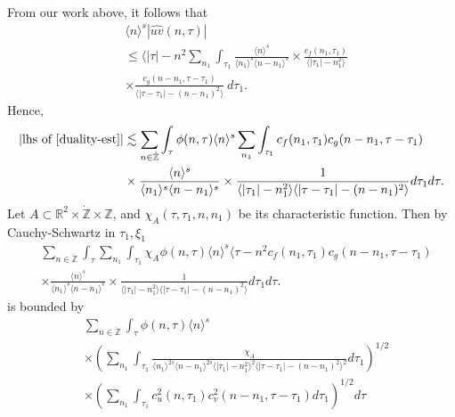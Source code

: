 \documentclass[12pt,reqno]{amsart}
\numberwithin{equation}{section}  %
\renewcommand{\cref}{\Cref}
\newcommand{\rr}{\mathbb{R}}
\newcommand{\zz}{\mathbb{Z}}
\newcommand{\zzdot}{\dot{\zz}}
\newcommand{\wh}{\widehat}
\begin{document}
%
%
From our work above, it follows that 
%
%
\begin{equation}
	\label{convo-est-starting-pnt}
	\begin{split}
		 & \langle n \rangle^s  | \wh{uv}\left( 
		n, \tau \right) |
		\\
		& \le \langle |\tau| - n^{2} 
		\sum_{n_{1}} \int_{\tau_{1}} \frac{\langle n \rangle^{s}}{\langle n_1 \rangle^s
    \langle n - n_1 \rangle^s} 
		\times \frac{c_f(n_1, \tau_1)}{\langle |\tau_1| - n_1^{2} \rangle}
		\\
		& \times
		\frac{c_g(n - n_1, \tau - \tau_1 )}{\langle |\tau - \tau_1| - (n - n_1)^{2}
    \rangle}\ d \tau_1.
	\end{split}
\end{equation}
%
%
Hence, 
%
%
\begin{equation}
  \label{pre-fubini-int-form}
	\begin{split}
    |\text{lhs of} \ \cref{duality-est}|
	& \lesssim \sum_{n \in \zzdot} \int_{\tau} \phi(n, \tau) \langle n \rangle^s 
  \sum_{n_{1}}
  \int_{\tau_{1}} c_f(n_1, \tau_1)
		c_g(n - n_1, \tau - \tau_1 )
		\\
    & \times \frac{\langle n \rangle ^{s}}{\langle n_{1} \rangle ^{s} \langle
    n-n_{1} \rangle ^{s}} \times \frac{1}{\langle |\tau_{1}|-n_{1}^{2} \rangle\langle | \tau -
    \tau_{1}|-(n - n_{1})^{2}
    \rangle} d \tau_1 d \tau.
	\end{split}
\end{equation}
%
Let $A \subset \rr^{2} \times \zzdot \times \zz$, and $\chi_{A}(\tau, \tau_{1}, n, n_{1})$
be its
characteristic function. Then by Cauchy-Schwartz in
$\tau_{1}, \xi_{1}$
\begin{equation*}
	\begin{split}
    & \sum_{n \in \zzdot} \int_{\tau}   \sum_{n_{1}}
    \int_{\tau_{1}} \chi_{A}
    \phi(n, \tau) \langle n \rangle^s \langle \tau - n^{2} 
  c_f(n_1, \tau_1)
		c_g(n - n_1, \tau - \tau_1 )
		\\
    & \times \frac{\langle n \rangle ^{s}}{\langle n_{1} \rangle ^{s} \langle
    n-n_{1} \rangle ^{s}} \times \frac{1}{\langle |\tau_{1}|-n_{1}^{2} \rangle\langle | \tau -
    \tau_{1}|-(n - n_{1})^{2}
    \rangle} d \tau_1 d \tau.
	\end{split}
\end{equation*}
%
is bounded by 
%
%
\begin{equation}
	\label{10g}
	\begin{split}
    & \sum_{n \in \zzdot} \int_{\tau} \phi(n, \tau) \langle n \rangle ^{s}
    \\
    & \times \left( \sum_{n_{1}} \int_{\tau_{1}}
    \frac{\chi_{A}}{\langle n_{1} \rangle ^{2s} \langle n-n_{1} \rangle ^{2s} \langle |
    \tau_{1} | - n_{1}^{2}\rangle^{2}  \langle | \tau - \tau_{1} | -
    (n - n_{1})^{2} \rangle^{2}} d \tau_{1} \right)^{1/2}
    \\
    & \times \left( \sum_{n_{1}} \int_{\tau_{1}} c_{u}^{2}(n, \tau_{1})
    c_{v}^{2}(n - n_{1}, \tau - \tau_{1}) d \tau_{1} \right)^{1/2} d \tau
  \end{split}
\end{equation}
\end{document}
